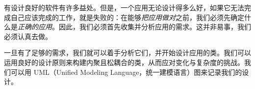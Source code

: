 有设计良好的软件有许多益处。但是，一个应用无论设计得多么好，如果它无法完成自己应该完成的工作，就是失败的：在能够\emph{把应用做对}之前，我们必须先确定什么是\emph{正确的应用}。因此，我们必须首先收集并分析应用的需求。这并非易事，我们必须认真去做。

一旦有了足够的需求，我们就可以着手分析它们，并开始设计应用的类。我们可以运用良好的设计原则来构建内聚且松耦合的类，从而应对变化与复杂度的挑战。我们可以用 UML（Unified Modeling Language，统一建模语言）图来记录我们的设计。
